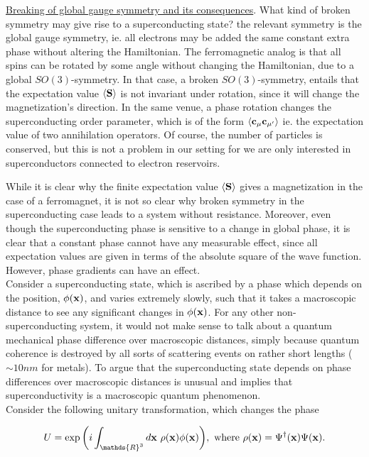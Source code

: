 \underline{Breaking of global gauge symmetry and its consequences}. What kind of broken symmetry may give rise to a superconducting state? the relevant symmetry is the global gauge symmetry, ie. all electrons may be added the same constant extra phase without altering the Hamiltonian. The ferromagnetic analog is that all spins can be rotated by some angle without changing the Hamiltonian, due to a global $SO(3)$-symmetry. In that case, a broken $SO(3)$-symmetry, entails that the expectation value $\langle {
\bf S}\rangle$ is not invariant under rotation, since it will change the magnetization's direction. In the same venue, a phase rotation changes the superconducting order parameter, which is of the form $\langle {\bf c}_{\mu} {\bf c}_{\mu'} \rangle$ ie. the expectation value of two annihilation operators. Of course, the number of particles is conserved, but this is not a problem in our setting for we are only interested in superconductors connected to electron reservoirs. 

While it is clear why the finite expectation value $\langle {\bf S} \rangle$ gives a magnetization in the case of a ferromagnet, it is not so clear why broken symmetry in the superconducting case leads to a system without resistance. Moreover, even though the superconducting phase is sensitive to a change in global phase, it is clear that a constant phase cannot have any measurable effect, since all expectation values are given in terms of the absolute square of the wave function. However, phase gradients can have an effect. \\

Consider a superconducting state, which is ascribed by a phase which depends on the position, $\phi({\bf x})$, and varies extremely slowly, such that it takes a macroscopic distance to see any significant changes in $\phi({\bf x})$. For any other non-superconducting system, it would not make sense to talk about a quantum mechanical phase difference over macroscopic distances, simply because quantum coherence is destroyed by all sorts of scattering events on rather short lengths ($\sim 10 nm$ for metals). To argue that the superconducting state depends on phase differences over macroscopic distances is unusual and implies that superconductivity is a macroscopic quantum phenomenon. \\

Consider the following unitary transformation, which changes the phase 

$$
    U = \exp \bigg( i \int_{\mathds{R}^3} d{\bf x} \blanky \rho({\bf x}) \phi({\bf x}) \bigg), \textnormal{ where } \rho({\bf x}) =  \Psi^{\dagger}({\bf x}) \Psi({\bf x}).
$$

